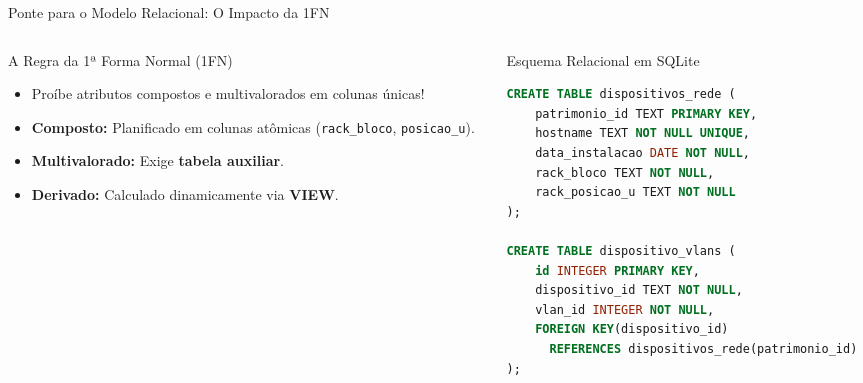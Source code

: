 \begin{frame}[fragile]{Ponte para o Modelo Relacional: O Impacto da 1FN}
  \vspace{0.2cm}
  \begin{columns}[t]
    \begin{column}{0.48\textwidth}
      \footnotesize
      \alert{A Regra da 1ª Forma Normal (1FN)}\par
      \vspace{0.15cm}
      \begin{itemize}\setlength{\itemsep}{1.5mm}\setlength{\parskip}{0pt}
        \item Proíbe atributos compostos e multivalorados em colunas únicas!
        \item \textbf{Composto:} Planificado em colunas atômicas (\texttt{rack\_bloco}, \texttt{posicao\_u}).
        \item \textbf{Multivalorado:} Exige \textbf{tabela auxiliar}.
        \item \textbf{Derivado:} Calculado dinamicamente via \textbf{VIEW}.
      \end{itemize}
    \end{column}

    \begin{column}{0.48\textwidth}
      \alert{Esquema Relacional em SQLite}\par
      \vspace{0.15cm}
\begin{lstlisting}[language=SQL,basicstyle=\ttfamily\fontsize{5.5}{6.5}\selectfont]
CREATE TABLE dispositivos_rede (
    patrimonio_id TEXT PRIMARY KEY,
    hostname TEXT NOT NULL UNIQUE,
    data_instalacao DATE NOT NULL,
    rack_bloco TEXT NOT NULL,
    rack_posicao_u TEXT NOT NULL
);

CREATE TABLE dispositivo_vlans (
    id INTEGER PRIMARY KEY,
    dispositivo_id TEXT NOT NULL,
    vlan_id INTEGER NOT NULL,
    FOREIGN KEY(dispositivo_id)
      REFERENCES dispositivos_rede(patrimonio_id)
);
\end{lstlisting}
    \end{column}
  \end{columns}
\end{frame}
